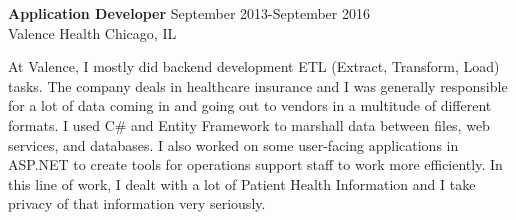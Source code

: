 \textbf{Application Developer} \hfill September 2013-September 2016 \\
Valence Health \hfill Chicago, IL
\begin{description}  \itemsep -2pt %
\item At Valence, I mostly did backend development ETL (Extract,
Transform, Load) tasks. The company deals in healthcare insurance and I
was generally responsible for a lot of data coming in and going out to
vendors in a multitude of different formats. I used C\# and Entity
Framework to marshall data between files, web services, and databases.
I also worked on some user-facing applications in ASP.NET
to create tools for operations support staff to work more efficiently.
In this line of work, I dealt with a lot of Patient Health Information
and I take privacy of that information very seriously.
\end{description}
